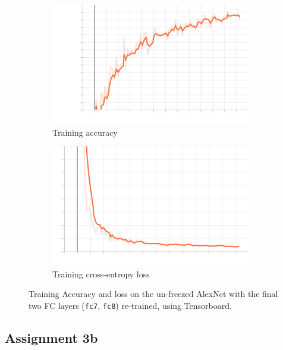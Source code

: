 \documentclass{article}
\def\code#1{\texttt{#1}}
\begin{document}
   	\begin{figure}[hbt!]
   		\centering
    	\hfil
    	\begin{subfigure}{.40\textwidth}
    		\includegraphics[width=\linewidth]{images/accuracy_fc7_fc8.png}
    		\caption{Training accuracy}
    		\label{MLEDdet}
    	\end{subfigure}
    	\hfil
    	\begin{subfigure}{.40\textwidth}
    		\includegraphics[width=\linewidth]{images/loss_fc7_fc8.png}
    		\caption{Training cross-entropy loss}
    		\label{energydetPSK}
    	\end{subfigure}	
        \label{fig:tb2}
    	\caption{Training Accuracy and loss on the un-freezed AlexNet with the final two FC layers (\code{fc7}, \code{fc8}) re-trained, using Tensorboard.}
    \end{figure}

    \pagebreak
    
    \subsection{Assignment 3b}
    
\end{document}
